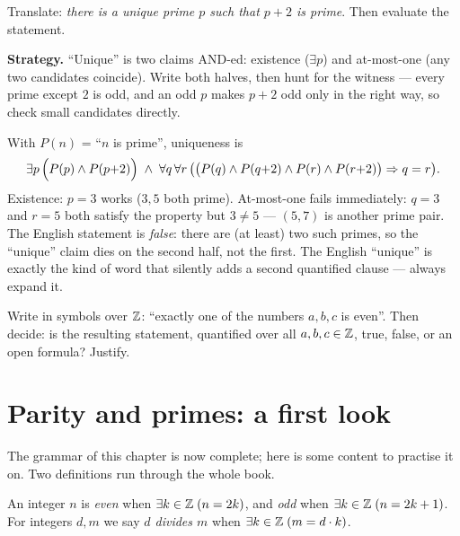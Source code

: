 \begin{example}\label{ex:unique}
Translate: \emph{there is a unique prime $p$ such that $p{+}2$ is prime}. Then
evaluate the statement.
\par\smallskip
\textbf{Strategy.} ``Unique'' is two claims AND-ed: existence ($\exists p$) and
at-most-one (any two candidates coincide). Write both halves, then hunt for the
witness --- every prime except $2$ is odd, and an odd $p$ makes $p{+}2$ odd only
in the right way, so check small candidates directly.
\par\smallskip
\begin{solution}
With $P(n)$ = ``$n$ is prime'', uniqueness is
\[
\exists p\,\Bigl(P(p)\land P(p{+}2)\Bigr)\;\land\;
\forall q\,\forall r\,\bigl(\bigl(P(q)\land P(q{+}2)\land P(r)\land P(r{+}2)\bigr)
\Rightarrow q=r\bigr).
\]
Existence: $p=3$ works ($3,5$ both prime). At-most-one fails immediately:
$q=3$ and $r=5$ both satisfy the property but $3\neq 5$ --- $(5,7)$ is another
prime pair. The English statement is \emph{false}: there are (at least) two such
primes, so the ``unique'' claim dies on the second half, not the first. The
English ``unique'' is exactly the kind of word that silently adds a second
quantified clause --- always expand it.
\end{solution}
\end{example}

\begin{exercise}[medium]\label{exr:translate}
Write in symbols over $\mathbb{Z}$: ``exactly one of the numbers $a,b,c$ is even''. Then
decide: is the resulting statement, quantified over all $a,b,c\in\mathbb{Z}$, true, false,
or an open formula? Justify.
\end{exercise}

\section{Parity and primes: a first look}\label{sec:parity}

The grammar of this chapter is now complete; here is some content to practise it on.
Two definitions run through the whole book.

\begin{definition}
An integer $n$ is \emph{even} when $\exists k\in\mathbb{Z}\;(n=2k)$, and \emph{odd} when
$\exists k\in\mathbb{Z}\;(n=2k+1)$. For integers $d,m$ we say \emph{$d$ divides $m$} when
$\exists k\in\mathbb{Z}\;(m=d\cdot k)$.
\end{definition}

